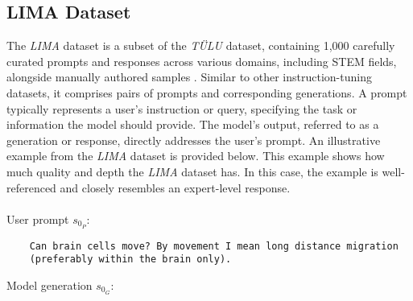 
\subsection{LIMA Dataset}\label{subsec:lima_dataset}
The \emph{LIMA} dataset is a subset of the \emph{TÜLU} dataset, containing 1,000 carefully curated prompts and responses across various domains, including STEM fields, alongside manually authored samples \cite{zhou2023limaalignment}. Similar to other instruction-tuning datasets, it comprises pairs of prompts and corresponding generations. A prompt typically represents a user's instruction or query, specifying the task or information the model should provide. The model's output, referred to as a generation or response, directly addresses the user's prompt. An illustrative example from the \emph{LIMA} dataset is provided below. This example shows how much quality and depth the \emph{LIMA} dataset has. In this case, the example is well-referenced and closely resembles an expert-level response.
\\\\
User prompt $s_{0_P}$:
\begin{verbatim}
    Can brain cells move? By movement I mean long distance migration 
    (preferably within the brain only).
\end{verbatim}
Model generation $s_{0_G}$:
